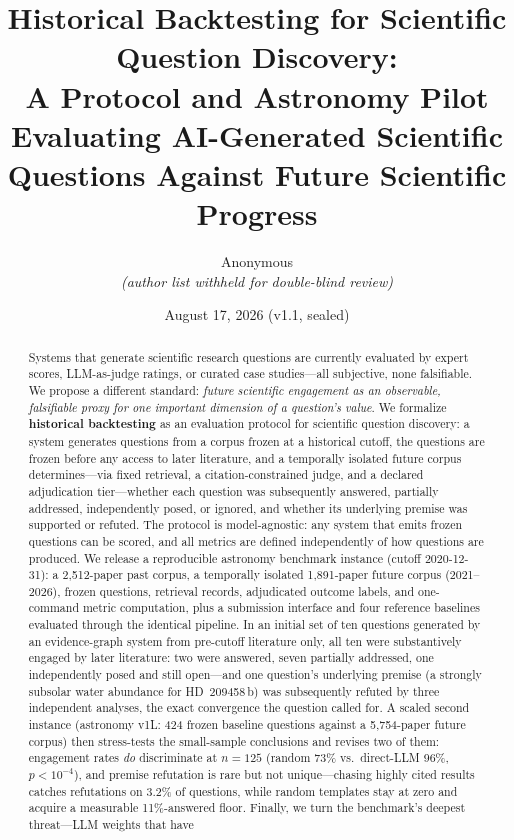 \documentclass[11pt]{article}
\title{Historical Backtesting for Scientific Question Discovery:\\
A Protocol and Astronomy Pilot\\[0.6em]
\large Evaluating AI-Generated Scientific Questions Against Future
Scientific Progress}
\author{%
  Anonymous\\
  \textit{(author list withheld for double-blind review)}
}
\date{August 17, 2026 (v1.1, sealed)}
\begin{document}
\maketitle

\begin{abstract}
Systems that generate scientific research questions are currently
evaluated by expert scores, LLM-as-judge ratings, or curated case
studies---all subjective, none falsifiable. We propose a different
standard: \emph{future scientific engagement as an observable,
falsifiable proxy for one important dimension of a question's value}.
We formalize \textbf{historical
backtesting} as an evaluation protocol for scientific question
discovery: a system generates questions from a corpus frozen at a
historical cutoff, the questions are frozen before any access to later
literature, and a temporally isolated future corpus determines---via
fixed retrieval, a citation-constrained judge, and a declared
adjudication tier---whether each question was subsequently answered,
partially addressed, independently posed, or ignored, and whether its
underlying premise was supported or refuted. The protocol is
model-agnostic: any system that emits frozen questions can be scored,
and all metrics are defined independently of how questions are produced.
We release a reproducible astronomy benchmark instance
(cutoff 2020-12-31): a 2{,}512-paper past corpus, a temporally isolated
1{,}891-paper future corpus (2021--2026), frozen questions, retrieval
records, adjudicated outcome labels, and one-command metric computation,
plus a submission interface and four reference baselines evaluated
through the identical pipeline. In an initial set of ten questions
generated by an evidence-graph system from pre-cutoff literature only,
all ten were substantively engaged by later literature: two were
answered, seven partially addressed, one independently posed and still
open---and one question's underlying premise (a strongly subsolar water
abundance for HD~209458\,b) was subsequently refuted by three
independent analyses, the exact convergence the question called for.
A scaled second instance (astronomy v1L: 424 frozen baseline questions
against a 5{,}754-paper future corpus) then stress-tests the
small-sample conclusions and revises two of them: engagement rates
\emph{do} discriminate at $n=125$ (random 73\% vs.\ direct-LLM 96\%,
$p<10^{-4}$), and premise refutation is rare but not unique---chasing
highly cited results catches refutations on 3.2\% of questions, while
random templates stay at zero and acquire a measurable
11\%-answered floor. Finally, we turn the benchmark's deepest threat---LLM weights that have

\end{abstract}
\end{document}
